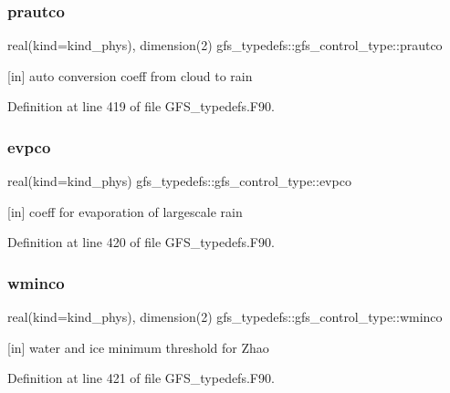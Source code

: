 \subsubsection{prautco}
{\footnotesize\ttfamily real(kind=kind\+\_\+phys), dimension(2) gfs\+\_\+typedefs\+::gfs\+\_\+control\+\_\+type\+::prautco}



[in] auto conversion coeff from cloud to rain 



Definition at line 419 of file G\+F\+S\+\_\+typedefs.\+F90.

\mbox{\label{structgfs__typedefs_1_1gfs__control__type_a6de866504a68312478400cadcd9bab6e}} 
\subsubsection{evpco}
{\footnotesize\ttfamily real(kind=kind\+\_\+phys) gfs\+\_\+typedefs\+::gfs\+\_\+control\+\_\+type\+::evpco}



[in] coeff for evaporation of largescale rain 



Definition at line 420 of file G\+F\+S\+\_\+typedefs.\+F90.

\mbox{\label{structgfs__typedefs_1_1gfs__control__type_a896bbce71598b48370a4cb777bf86b40}} 
\subsubsection{wminco}
{\footnotesize\ttfamily real(kind=kind\+\_\+phys), dimension(2) gfs\+\_\+typedefs\+::gfs\+\_\+control\+\_\+type\+::wminco}



[in] water and ice minimum threshold for Zhao 



Definition at line 421 of file G\+F\+S\+\_\+typedefs.\+F90.

\mbox{\label{structgfs__typedefs_1_1gfs__control__type_a8473de98b7c8118a7da1c5c08b45b863}} 
